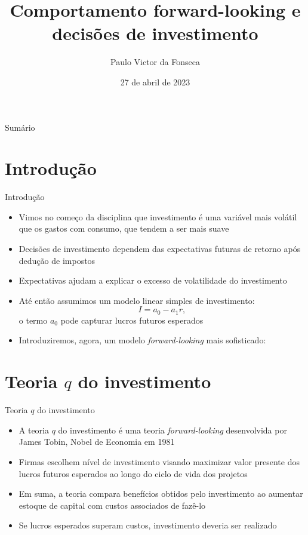 \documentclass[10pt]{beamer}
\title[]{Comportamento forward-looking e decisões de investimento}
\author[]{Paulo Victor da Fonseca}
\date{27 de abril de 2023}
\begin{document}
\begin{frame}[plain]
\end{frame}

\begin{frame}{Sumário}
    \tableofcontents
\end{frame}

\section{Introdução}
\begin{frame}{Introdução}
    \begin{itemize}
        \item Vimos no começo da disciplina que investimento é uma variável mais volátil que os gastos com consumo, que tendem a ser mais suave\bigskip
        \item Decisões de investimento dependem das expectativas futuras de retorno após dedução de impostos\bigskip
        \item Expectativas ajudam a explicar o excesso de volatilidade do investimento\bigskip
        \item Até então assumimos um modelo linear simples de investimento:
        \[
        I = a_0 - a_1r,    
        \]
        o termo $a_0$ pode capturar lucros futuros esperados\bigskip
        \item Introduziremos, agora, um modelo \emph{forward-looking} mais sofisticado: 
    \end{itemize}
\end{frame}

\section{Teoria $q$ do investimento}
\begin{frame}{Teoria $q$ do investimento}
    \begin{itemize}
        \item A teoria $q$ do investimento é uma teoria \emph{forward-looking} desenvolvida por James Tobin, Nobel de Economia em 1981\bigskip
        \item Firmas escolhem nível de investimento visando maximizar valor presente dos lucros futuros esperados ao longo do ciclo de vida dos projetos\bigskip
        \item Em suma, a teoria compara benefícios obtidos pelo investimento ao aumentar estoque de capital com custos associados de fazê-lo\bigskip
        \item Se lucros esperados superam custos, investimento deveria ser realizado
    \end{itemize}
\end{frame}
\end{document}
